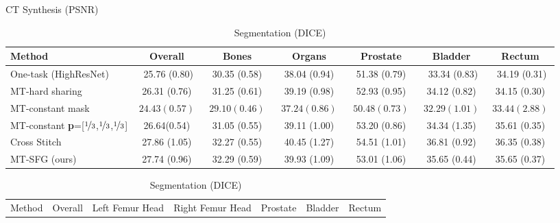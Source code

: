 \begin{table}[t!]
    \begin{subtable}[t]{1.0\linewidth}
        \caption{CT Synthesis (PSNR)}
        \vspace{-5mm}
        \begin{center}
            \scriptsize
            \begin{tabular}{l|c|ccccc}
            \hline
                \toprule
                Method   & Overall   &  Bones  & Organs &  Prostate & Bladder & Rectum  \\
                \midrule
                 One-task (HighResNet) \cite{wenqi} & $\,\,$ 25.76 (0.80)$\,\,$ & $\,\,$ 30.35 (0.58) $\,\,$  & $\,\,$ 38.04 (0.94) $\,\,$ & $\,\,$ 51.38 (0.79) $\,\,$ & $\,\,$ 33.34 (0.83)$\,\,$ & $\,\,$ 34.19 (0.31)$\,\,$  \\
                \multirow{1}{*}{MT-hard sharing }  & 26.31 (0.76) & 31.25 (0.61) & 39.19 (0.98) & 52.93 (0.95)  & 34.12 (0.82) & 34.15 (0.30) \\
                \multirow{1}{*}{MT-constant mask}   &  $24.43 (0.57)$  & $29.10 (0.46)$  & $37.24 (0.86)$ & $50.48 (0.73) $  & $32.29 (1.01)$ & $33.44 (2.88)$  \\
                \multirow{1}{*}{MT-constant \textbf{p}=[$\nicefrac{1}{3}$,$\nicefrac{1}{3}$,$\nicefrac{1}{3}$]}   & 26.64(0.54)  & 31.05 (0.55) & 39.11 (1.00)    & \cellcolor{blue!15} 53.20 (0.86)  & 34.34 (1.35) &  35.61 (0.35) \\
                \multirow{1}{*}{Cross Stitch \cite{MisraCrossMTL16}}   & \cellcolor{red!15}  27.86 (1.05)  & \cellcolor{blue!15}  32.27 (0.55)  & \cellcolor{red!15}  40.45 (1.27)  & \cellcolor{red!15} 54.51 (1.01)     & \cellcolor{red!15}  36.81 (0.92) &  \cellcolor{red!15} 36.35 (0.38)     \\
                \multirow{1}{*}{MT-SFG (ours)}  &   \cellcolor{blue!15} 27.74 (0.96) &  \cellcolor{red!15}  32.29 (0.59)&  \cellcolor{blue!15}  39.93 (1.09)& 53.01 (1.06)   &  \cellcolor{blue!15} 35.65 (0.44)& \cellcolor{blue!15} 35.65 (0.37)  \\
        \hline
        \end{tabular}
        \end{center}
    \label{tab:ct}
    \end{subtable}
    
    \begin{subtable}[t]{1.0\linewidth}
        \vspace{0mm}
        \caption{Segmentation (DICE)}
        \vspace{-5mm}
        \begin{center}
            \centering
            \scriptsize
            \begin{tabular}{l|c|ccccc}
            \hline
                \toprule
                Method & Overall  &   Left Femur Head &  Right Femur Head &  Prostate & Bladder & Rectum   \\
                

\end{tabular}
\end{center}
\end{subtable}
\end{table}
